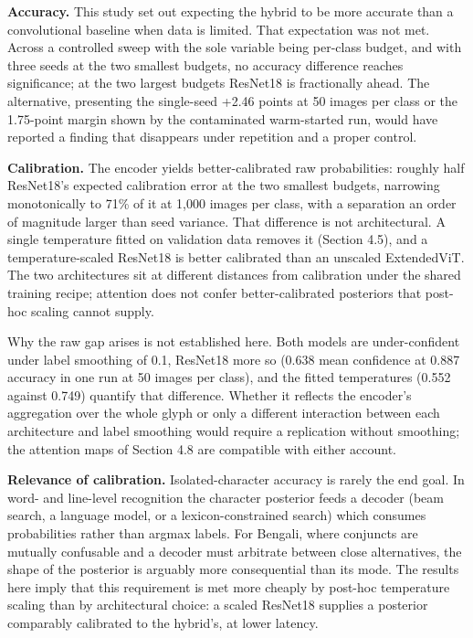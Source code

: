 \textbf{Accuracy.} This study set out expecting the hybrid to be more accurate than a convolutional baseline
when data is limited. That expectation was not met. Across a controlled sweep with the sole
variable being per-class budget, and with three seeds at the two
smallest budgets, no accuracy difference reaches significance; at the
two largest budgets ResNet18 is fractionally ahead. The alternative,
presenting the single-seed +2.46 points at 50 images per class or the
1.75-point margin shown by the contaminated warm-started run, would have
reported a finding that disappears under repetition and a proper control.

\textbf{Calibration.} The encoder yields better-calibrated raw probabilities: roughly half ResNet18's expected calibration error at the two smallest budgets, narrowing monotonically to 71\% of it at 1,000 images per class, with a separation an order of magnitude larger than seed variance. That difference is not architectural. A single temperature fitted on validation data removes it (Section 4.5), and a temperature-scaled ResNet18 is better calibrated than an unscaled ExtendedViT. The two architectures sit at different distances from calibration under the shared training recipe; attention does not confer better-calibrated posteriors that post-hoc scaling cannot supply.

Why the raw gap arises is not established here. Both models are under-confident under label smoothing of 0.1, ResNet18 more so (0.638 mean confidence at 0.887 accuracy in one run at 50 images per class), and the fitted temperatures (0.552 against 0.749) quantify that difference. Whether it reflects the encoder's aggregation over the whole glyph or only a different interaction between each architecture and label smoothing would require a replication without smoothing; the attention maps of Section 4.8 are compatible with either account.

\textbf{Relevance of calibration.} Isolated-character accuracy is
rarely the end goal. In word- and line-level recognition the character
posterior feeds a decoder (beam search, a language model, or a
lexicon-constrained search) which consumes probabilities rather than argmax labels. For Bengali, where conjuncts are mutually confusable and a decoder must arbitrate between close alternatives, the shape of the posterior is arguably more consequential than its mode. The results here imply that this requirement is met more cheaply by post-hoc temperature scaling than by architectural choice: a scaled ResNet18 supplies a posterior comparably calibrated to the hybrid's, at lower latency.

